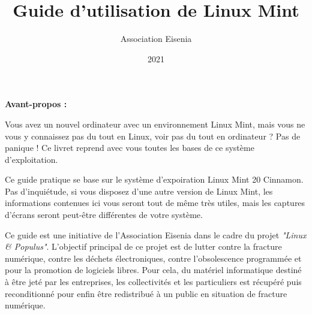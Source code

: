 \documentclass[12pt]{book}
\title{Guide d'utilisation de Linux Mint}
\author{Association Eisenia}
\date{2021}
\begin{document}
\renewcommand{\contentsname}{Sommaire}
\renewcommand{\tablename}{\textsc{Tableau}}
\renewcommand{\figurename}{\textsc{Capture d'écran}}
\renewcommand{\chaptername}{Chapitre}

\newpage
	\begin{center}
		\textbf{Avant-propos :}
	\end{center}\par
	Vous avez un nouvel ordinateur avec un environnement Linux Mint, mais vous ne vous y connaissez pas du tout en Linux, voir pas du tout en ordinateur ?
	Pas de panique ! 
	Ce livret reprend avec vous toutes les bases de ce système d'exploitation.\par
	Ce guide pratique se base sur le système d'expoiration Linux Mint 20 Cinnamon.
	Pas d'inquiétude, si vous disposez d'une autre version de Linux Mint, les informations contenues ici vous seront tout de même très utiles, mais les captures d'écrans seront peut-être différentes de votre système.\par
	\medskip
	Ce guide est une initiative de l'Association Eisenia dans le cadre du projet \textit{"Linux \& Populus"}.
	L'objectif principal de ce projet est de lutter contre la fracture numérique, contre les déchets électroniques, contre l'obsolescence programmée et pour la promotion de logiciels libres.
	Pour cela, du matériel informatique destiné à être jeté par les entreprises, les collectivités et les particuliers est récupéré puis reconditionné pour enfin être redistribué à un public en situation de fracture numérique.\par
\end{document}
